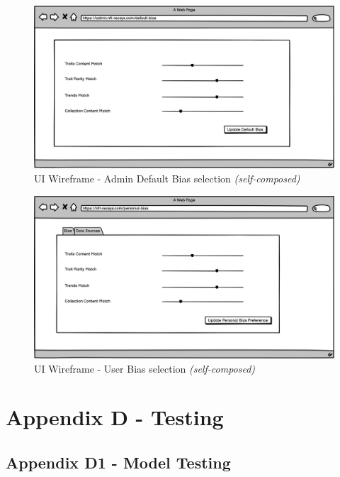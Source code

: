 \begin{figure}[h!]
\centering
\includegraphics[width=\textwidth]{images/appendix/UI Wireframes/Admin Default Bias selection.png}
\caption{UI Wireframe - Admin Default Bias selection \textit{(self-composed)}}
\end{figure}

\begin{figure}[h!]
\centering
\includegraphics[width=\textwidth]{images/appendix/UI Wireframes/User Bias selection.png}
\caption{UI Wireframe - User Bias selection \textit{(self-composed)}}
\end{figure}


\chapter{Appendix D - Testing}
\label{appendix:testing}

\section*{Appendix D1 - Model Testing}

